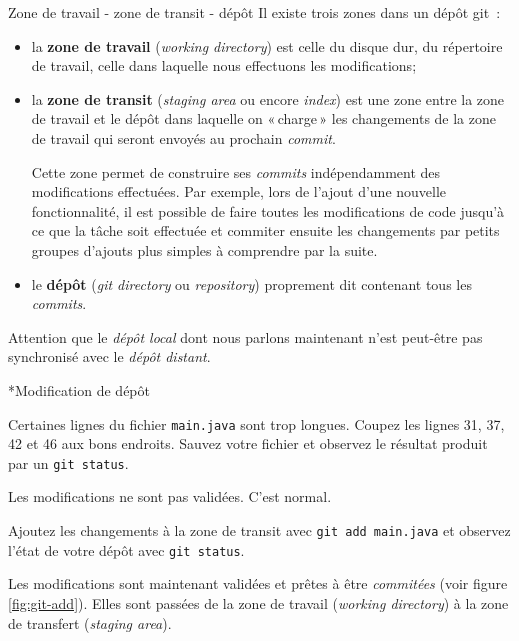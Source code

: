\documentclass[a4paper,11pt]{style-esi/td}
\begin{document}
\begin{theorie}{Zone de travail - zone de transit - dépôt}
	Il existe trois zones dans un dépôt git : 
	\begin{itemize}
		\item la \textbf{zone de travail} (\textit{working directory}) est celle 
			du disque dur, du répertoire de travail, celle dans laquelle nous 
			effectuons les modifications;

		\item la \textbf{zone de transit} (\textit{staging area} ou encore
			\textit{index}) est une zone entre la zone de travail et le dépôt
			dans laquelle on « charge » les changements de la zone de travail
			qui seront envoyés au prochain \textit{commit}.

			Cette zone permet de construire ses \textit{commits} indépendamment
			des modifications effectuées. Par exemple, lors de l'ajout d'une
			nouvelle fonctionnalité, il est possible de faire toutes les
			modifications de code jusqu'à ce que la tâche soit effectuée et
			commiter ensuite les changements par petits groupes d'ajouts plus
			simples à comprendre par la suite. 

		\item le \textbf{dépôt} (\textit{git directory} ou \textit{repository})
			proprement dit contenant tous les \textit{commits}. 
	
	\end{itemize}

	Attention que le \textit{dépôt local} dont nous parlons maintenant 
	n'est peut-être pas synchronisé avec le \textit{dépôt distant}. 
	
\end{theorie}

\begin{Exercice}*{Modification de dépôt}
	\begin{steps}
		
	\item Certaines lignes du fichier \texttt{main.java} sont trop longues.
		Coupez les lignes 31, 37, 42 et 46 aux bons endroits. Sauvez votre
		fichier et observez le résultat produit par un \texttt{git status}.

		Les modifications ne sont pas validées. C'est normal. 

	\item Ajoutez les changements à la zone de transit avec \texttt{git add
		main.java} et observez l'état de votre dépôt avec \texttt{git status}.

		Les modifications sont maintenant validées et prêtes à être
		\textit{commitées} (voir figure \vref{fig:git-add}). Elles sont passées 
		de la zone de travail (\textit{working directory}) à la zone de transfert
		(\textit{staging area}).

	\end{steps}
\end{Exercice}
\end{document}

